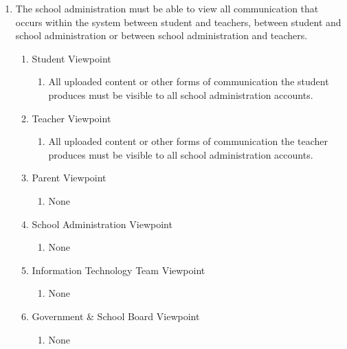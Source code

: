 \documentclass[]{article}
\begin{document}
\begin{enumerate}[{BE}1.]
	\item The school administration must be able to view all communication that 
occurs within the system between student and teachers, between student and 
school administration or between school administration and teachers.
	\begin{enumerate}[{VP1}.1]
		\item Student Viewpoint
			\begin{enumerate}
				\item All uploaded content or other forms of communication the student 
produces must be visible to all school administration accounts.
			\end{enumerate}
		\item Teacher Viewpoint
			\begin{enumerate}
				\item All uploaded content or other forms of communication the teacher 
produces must be visible to all school administration accounts.
			\end{enumerate}
		\item Parent Viewpoint
			\begin{enumerate}
				\item None
			\end{enumerate}
		\item School Administration Viewpoint
			\begin{enumerate}
				\item None
			\end{enumerate}
		\item Information Technology Team Viewpoint
			\begin{enumerate}
				\item None
			\end{enumerate}
		\item Government \& School Board Viewpoint
			\begin{enumerate}
				\item None
			\end{enumerate}
	\end{enumerate}


\end{enumerate}
\end{document}
